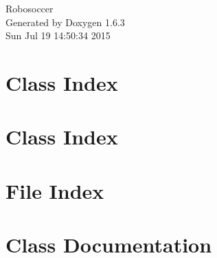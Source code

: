 \documentclass[a4paper]{book}
\begin{document}
\hypersetup{pageanchor=false}
\begin{titlepage}
\vspace*{7cm}
\begin{center}
{\Large Robosoccer }\\
\vspace*{1cm}
{\large Generated by Doxygen 1.6.3}\\
\vspace*{0.5cm}
{\small Sun Jul 19 14:50:34 2015}\\
\end{center}
\end{titlepage}
\clearemptydoublepage
{}
\tableofcontents
\clearemptydoublepage
{}
\hypersetup{pageanchor=true}
\chapter{Class Index}

\chapter{Class Index}

\chapter{File Index}

\chapter{Class Documentation}
































\end{document}
